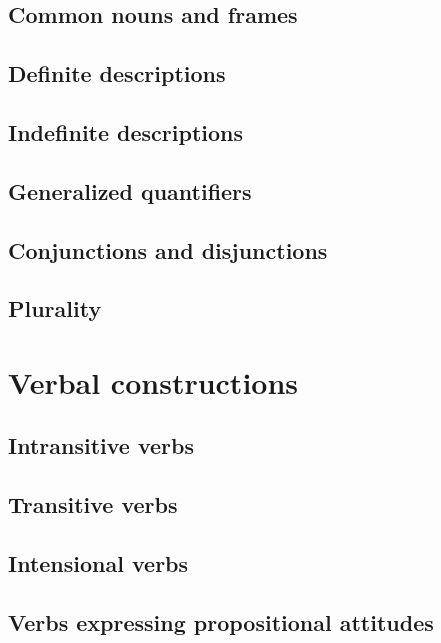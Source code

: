 \subsection{Common nouns and frames}

\subsection{Definite descriptions}

\subsection{Indefinite descriptions}

\subsection{Generalized quantifiers}

\subsection{Conjunctions and disjunctions}

\subsection{Plurality}

\newpage

\section{Verbal constructions}

\subsection{Intransitive verbs}

\subsection{Transitive verbs}

\subsection{Intensional verbs}

\subsection{Verbs expressing propositional attitudes}

